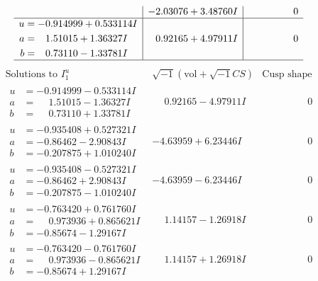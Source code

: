 \documentclass[1p]{elsarticle_modified}
\theoremstyle{definition}
\newcommand{\I}{\sqrt{-1}}
\begin{document}
$$\begin{array}{c|c|c}
 & -2.03076 + 3.48760 I & \phantom{-0.000000 } 0 \\ \hline\begin{aligned}
u &= -0.914999 + 0.533114 I \\
a &= \phantom{-}1.51015 + 1.36327 I \\
b &= \phantom{-}0.73110 - 1.33781 I\end{aligned}
 & \phantom{-}0.92165 + 4.97911 I & \phantom{-0.000000 } 0\\
 \hline 
 \end{array}$$\newpage$$\begin{array}{c|c|c}  
\text{Solutions to }I^u_{1}& \I (\text{vol} + \sqrt{-1}CS) & \text{Cusp shape}\\
 \hline 
\begin{aligned}
u &= -0.914999 - 0.533114 I \\
a &= \phantom{-}1.51015 - 1.36327 I \\
b &= \phantom{-}0.73110 + 1.33781 I\end{aligned}
 & \phantom{-}0.92165 - 4.97911 I & \phantom{-0.000000 } 0 \\ \hline\begin{aligned}
u &= -0.935408 + 0.527321 I \\
a &= -0.86462 - 2.90843 I \\
b &= -0.207875 + 1.010240 I\end{aligned}
 & -4.63959 + 6.23446 I & \phantom{-0.000000 } 0 \\ \hline\begin{aligned}
u &= -0.935408 - 0.527321 I \\
a &= -0.86462 + 2.90843 I \\
b &= -0.207875 - 1.010240 I\end{aligned}
 & -4.63959 - 6.23446 I & \phantom{-0.000000 } 0 \\ \hline\begin{aligned}
u &= -0.763420 + 0.761760 I \\
a &= \phantom{-}0.973936 + 0.865621 I \\
b &= -0.85674 - 1.29167 I\end{aligned}
 & \phantom{-}1.14157 - 1.26918 I & \phantom{-0.000000 } 0 \\ \hline\begin{aligned}
u &= -0.763420 - 0.761760 I \\
a &= \phantom{-}0.973936 - 0.865621 I \\
b &= -0.85674 + 1.29167 I\end{aligned}
 & \phantom{-}1.14157 + 1.26918 I & \phantom{-0.000000 } 0 \\ \hline\begin{aligned}

\end{aligned}
\end{array}$$
\end{document}
